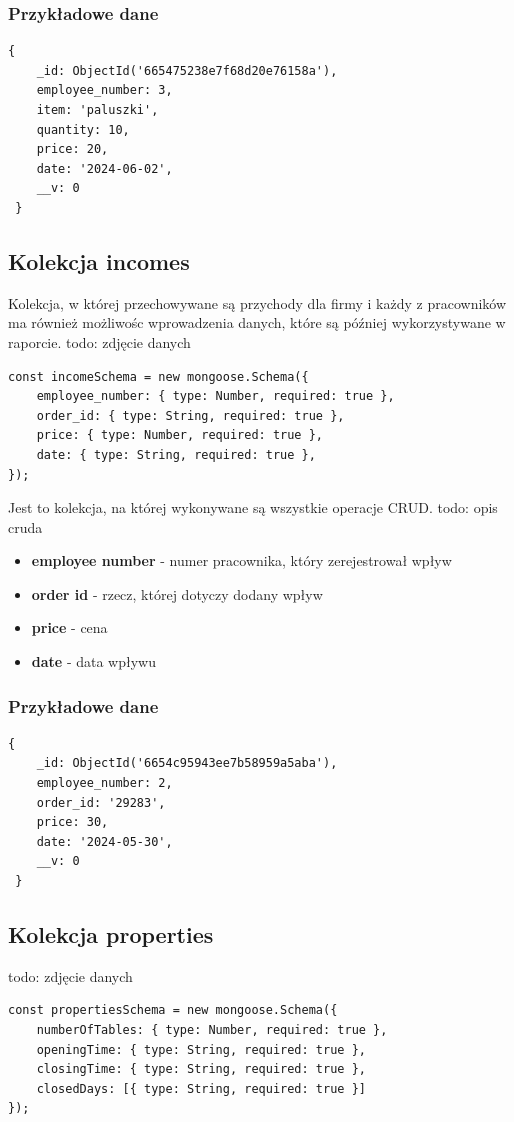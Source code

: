 \documentclass[12pt]{article}
\begin{document}
\subsubsection{Przykładowe dane}
\begin{lstlisting}[]
 {
    _id: ObjectId('665475238e7f68d20e76158a'),
    employee_number: 3,
    item: 'paluszki',
    quantity: 10,
    price: 20,
    date: '2024-06-02',
    __v: 0
 }
\end{lstlisting}

\newpage
\begin{samepage}
\subsection{Kolekcja incomes}
Kolekcja, w której przechowywane są przychody dla firmy i każdy z pracowników ma również możliwośc wprowadzenia danych, które są później wykorzystywane w raporcie.
todo: zdjęcie danych
\begin{lstlisting}[caption={Incomes}]
const incomeSchema = new mongoose.Schema({
    employee_number: { type: Number, required: true },
    order_id: { type: String, required: true },
    price: { type: Number, required: true },
    date: { type: String, required: true },
});
\end{lstlisting}
Jest to kolekcja, na której wykonywane są wszystkie operacje CRUD.
todo: opis cruda
\end{samepage}

\begin{itemize}
	\item \textbf{employee number} - numer pracownika, który zerejestrował wpływ
	\item \textbf{order id} - rzecz, której dotyczy dodany wpływ
	\item \textbf{price} - cena
	\item \textbf{date} - data wpływu
\end{itemize}

\subsubsection{Przykładowe dane}
\begin{lstlisting}[]
 {
    _id: ObjectId('6654c95943ee7b58959a5aba'),
    employee_number: 2,
    order_id: '29283',
    price: 30,
    date: '2024-05-30',
    __v: 0
 }
\end{lstlisting}

\newpage
\begin{samepage}
\subsection{Kolekcja properties}
todo: zdjęcie danych
\begin{lstlisting}[caption={Properties}]
const propertiesSchema = new mongoose.Schema({
    numberOfTables: { type: Number, required: true },
    openingTime: { type: String, required: true },
    closingTime: { type: String, required: true },
    closedDays: [{ type: String, required: true }]
});
\end{lstlisting}
\end{samepage}
\end{document}

